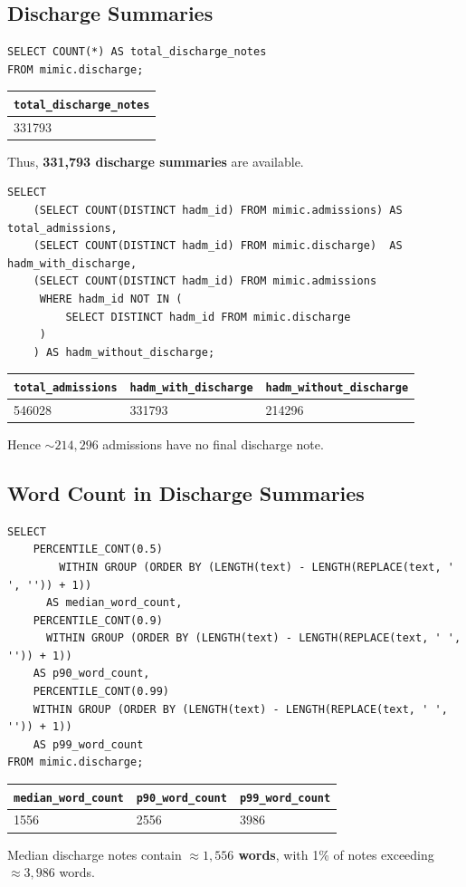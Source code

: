 \subsection{Discharge Summaries}
\begin{verbatim}
SELECT COUNT(*) AS total_discharge_notes
FROM mimic.discharge;
\end{verbatim}
\begin{center}
\begin{tabular}{l}
\hline
\texttt{total\_discharge\_notes} \\
\hline
331793 \\
\hline
\end{tabular}
\end{center}
Thus, \textbf{331,793 discharge summaries} are available.

\begin{verbatim}
SELECT
    (SELECT COUNT(DISTINCT hadm_id) FROM mimic.admissions) AS total_admissions,
    (SELECT COUNT(DISTINCT hadm_id) FROM mimic.discharge)  AS hadm_with_discharge,
    (SELECT COUNT(DISTINCT hadm_id) FROM mimic.admissions
     WHERE hadm_id NOT IN (
         SELECT DISTINCT hadm_id FROM mimic.discharge
     )
    ) AS hadm_without_discharge;
\end{verbatim}
\begin{center}
\begin{tabular}{l|l|l}
\hline
\texttt{total\_admissions} & \texttt{hadm\_with\_discharge} & \texttt{hadm\_without\_discharge} \\
\hline
546028 & 331793 & 214296 \\
\hline
\end{tabular}
\end{center}
Hence \(\sim214{,}296\) admissions have no final discharge note.

\subsection{Word Count in Discharge Summaries}
\begin{verbatim}
SELECT
    PERCENTILE_CONT(0.5)
        WITHIN GROUP (ORDER BY (LENGTH(text) - LENGTH(REPLACE(text, ' ', '')) + 1))
      AS median_word_count,
    PERCENTILE_CONT(0.9)
      WITHIN GROUP (ORDER BY (LENGTH(text) - LENGTH(REPLACE(text, ' ', '')) + 1))
    AS p90_word_count,
    PERCENTILE_CONT(0.99)
    WITHIN GROUP (ORDER BY (LENGTH(text) - LENGTH(REPLACE(text, ' ', '')) + 1))
    AS p99_word_count
FROM mimic.discharge;
\end{verbatim}
\begin{center}
\begin{tabular}{l|l|l}
\hline
\texttt{median\_word\_count} & \texttt{p90\_word\_count} & \texttt{p99\_word\_count} \\
\hline
1556 & 2556 & 3986 \\
\hline
\end{tabular}
\end{center}
Median discharge notes contain \textbf{\(\approx1{,}556\) words}, with 1\% of notes exceeding \(\approx3{,}986\) words.


